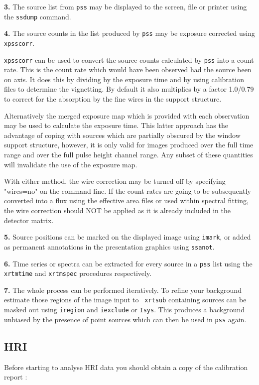 \documentclass[11pt,fleqn]{article}    %
\begin{document}
{\bf 3.} The source   list from {\tt   pss} may  be displayed  to  the
screen, file or printer using the {\tt ssdump} command.

{\bf 4.} The source  counts in the list  produced by {\tt pss} may  be
exposure corrected using {\tt xpsscorr}.

{\tt xpsscorr} can be used to convert  the source counts calculated by
{\tt pss} into a count rate. This  is the count  rate which would have
been observed had the source been on axis. It does this by dividing by
the exposure   time and by using  calibration  files to  determine the
vignetting.  By default it also   multiplies  by a factor 1.0/0.79  to
correct for the absorption by the fine wires in the support structure.

Alternatively the  merged  exposure map which   is provided with  each
observation  may be used to calculate  the exposure  time. This latter
approach has the advantage of coping  with sources which are partially
obscured by  the window support structure,  however, it  is only valid
for images produced  over the full time  range and over the full pulse
height channel  range. Any subset of  these quantities will invalidate
the use of the exposure map.

With    either method,  the wire    correction may be   turned  off by
specifying "wires=no" on  the command  line.  If the count rates   are
going to be  subsequently converted  into  a flux using the  effective
area files or used within spectral fitting, the wire correction should
NOT be applied as it is already included in the detector matrix.

{\bf  5.} Source positions can be  marked on the displayed image using
{\tt  imark}, or added  as  permanent annotations in  the presentation
graphics using {\tt ssanot}.

{\bf 6.} Time series or spectra can be extracted for every source in a
{\tt pss} list using the {\tt  xrtmtime} and {\tt xrtmspec} procedures
respectively.

{\bf 7.}   The whole process  can be  performed iteratively. To refine
your  background estimate those regions  of   the image input to  {\tt
xrtsub} containing  sources can be  masked out using {\tt iregion} and
{\tt iexclude} or {\tt Isys}.   This produces a background unbiased by
the  presence of  point  sources which can then   be used in {\tt pss}
again.

\subsection{HRI}
Before starting to  analyse HRI data you should  obtain a  copy of the
calibration report :
\end{document}
